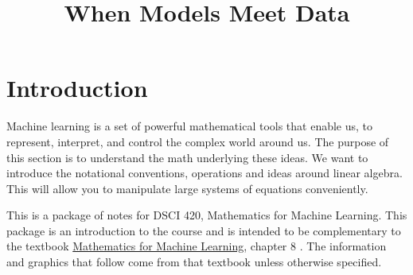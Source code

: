 \documentclass[
]{book}
\title{When Models Meet Data}
\author{}
\date{\vspace{-2.5em}}
\theoremstyle{definition}
\theoremstyle{definition}
\theoremstyle{definition}
\theoremstyle{definition}
\theoremstyle{remark}
\begin{document}
\maketitle

{
\setcounter{tocdepth}{1}
\tableofcontents
}
\hypertarget{introduction}{%
\chapter*{Introduction}\label{introduction}}

Machine learning is a set of powerful mathematical tools that enable us, to represent, interpret, and control the complex world around us. The purpose of this section is to understand the math underlying these ideas. We want to introduce the notational conventions, operations and ideas around linear algebra. This will allow you to manipulate large systems of equations conveniently.

This is a package of notes for DSCI 420, Mathematics for Machine Learning. This package is an introduction to the course and is intended to be complementary to the textbook \href{https://mml-book.github.io/book/mml-book.pdf}{Mathematics for Machine Learning}, chapter 8 \citep{Deisenroth_Faisal_Ong_2020}. The information and graphics that follow come from that textbook unless otherwise specified.
\end{document}
